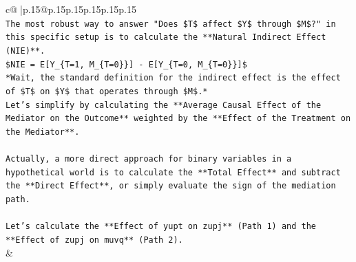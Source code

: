 \documentclass{article}
\begin{document}
{\begin{supertabular}{c@{$\;$}|p{.15\linewidth}@{}p{.15\linewidth}p{.15\linewidth}p{.15\linewidth}p{.15\linewidth}p{.15\linewidth}}
{{{\\ 
\texttt{The most robust way to answer "Does \$T\$ affect \$Y\$ through \$M\$?" in this specific setup is to calculate the **Natural Indirect Effect (NIE)**.} \\
\texttt{\$NIE = E{[}Y\_\{T=1, M\_\{T=0\}\}{]} {-} E{[}Y\_\{T=0, M\_\{T=0\}\}{]}\$} \\
\texttt{*Wait, the standard definition for the indirect effect is the effect of \$T\$ on \$Y\$ that operates through \$M\$.*} \\
\texttt{Let's simplify by calculating the **Average Causal Effect of the Mediator on the Outcome** weighted by the **Effect of the Treatment on the Mediator**.} \\
\\ 
\texttt{Actually, a more direct approach for binary variables in a hypothetical world is to calculate the **Total Effect** and subtract the **Direct Effect**, or simply evaluate the sign of the mediation path.} \\
\\ 
\texttt{Let's calculate the **Effect of yupt on zupj** (Path 1) and the **Effect of zupj on muvq** (Path 2).} \\
            }
        }
    }
    & \\ \\


\end{supertabular}}
\end{document}
